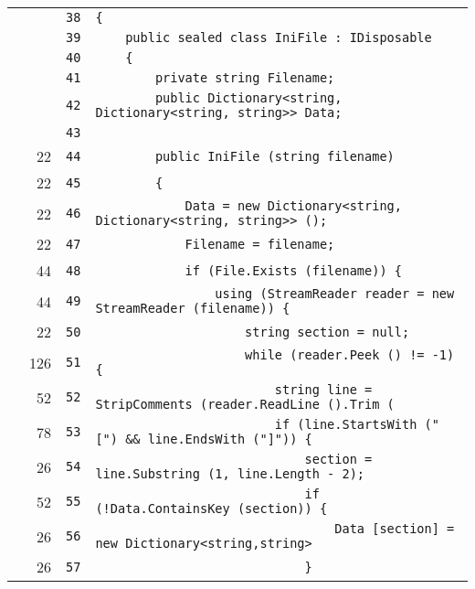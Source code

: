 \documentclass[a4paper,10pt]{article}
\begin{document}
\begin{longtable}[l]{lrrl}
\cellcolor{gray} &  & \verb~38~ & \verb~{~\\
\cellcolor{gray} &  & \verb~39~ & \verb~    public sealed class IniFile : IDisposable~\\
\cellcolor{gray} &  & \verb~40~ & \verb~    {~\\
\cellcolor{gray} &  & \verb~41~ & \verb~        private string Filename;~\\
\cellcolor{gray} &  & \verb~42~ & \verb~        public Dictionary<string, Dictionary<string, string>> Data;~\\
\cellcolor{gray} &  & \verb~43~ & \verb~~\\
\cellcolor{green} & 22 & \verb~44~ & \verb~        public IniFile (string filename)~\\
\cellcolor{green} & 22 & \verb~45~ & \verb~        {~\\
\cellcolor{green} & 22 & \verb~46~ & \verb~            Data = new Dictionary<string, Dictionary<string, string>> ();~\\
\cellcolor{green} & 22 & \verb~47~ & \verb~            Filename = filename;~\\
\cellcolor{green} & 44 & \verb~48~ & \verb~            if (File.Exists (filename)) {~\\
\cellcolor{green} & 44 & \verb~49~ & \verb~                using (StreamReader reader = new StreamReader (filename)) {~\\
\cellcolor{green} & 22 & \verb~50~ & \verb~                    string section = null;~\\
\cellcolor{green} & 126 & \verb~51~ & \verb~                    while (reader.Peek () != -1) {~\\
\cellcolor{green} & 52 & \verb~52~ & \verb~                        string line = StripComments (reader.ReadLine ().Trim (~\\
\cellcolor{green} & 78 & \verb~53~ & \verb~                        if (line.StartsWith ("[") && line.EndsWith ("]")) {~\\
\cellcolor{green} & 26 & \verb~54~ & \verb~                            section = line.Substring (1, line.Length - 2);~\\
\cellcolor{green} & 52 & \verb~55~ & \verb~                            if (!Data.ContainsKey (section)) {~\\
\cellcolor{green} & 26 & \verb~56~ & \verb~                                Data [section] = new Dictionary<string,string>~\\
\cellcolor{green} & 26 & \verb~57~ & \verb~                            }~\\

\end{longtable}
\end{document}
